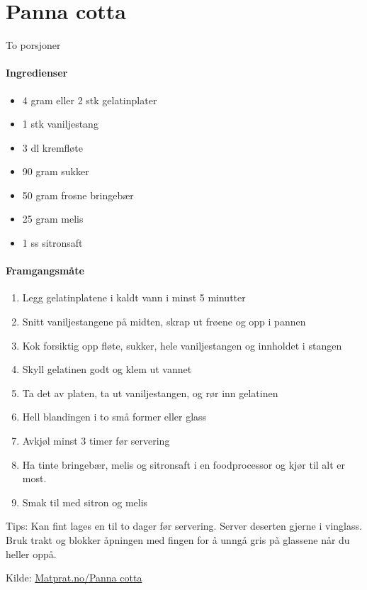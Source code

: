 \section{﻿Panna cotta}
\label{pannacotta}
To porsjoner

\paragraph{Ingredienser}
\begin{itemize}[noitemsep]
	\item 4 gram eller 2 stk gelatinplater
	\item 1 stk vaniljestang
	\item 3 dl kremfløte
	\item 90 gram sukker
	\item 50 gram frosne bringebær
	\item 25 gram melis
	\item 1 ss sitronsaft
\end{itemize}

\paragraph{Framgangsmåte}
\begin{enumerate}[noitemsep]
	\item Legg gelatinplatene i kaldt vann i minst 5 minutter
	\item Snitt vaniljestangene på midten, skrap ut frøene og opp i pannen
	\item Kok forsiktig opp fløte, sukker, hele vaniljestangen og innholdet i stangen
	\item Skyll gelatinen godt og klem ut vannet
	\item Ta det av platen, ta ut vaniljestangen, og rør inn gelatinen
	\item Hell blandingen i to små former eller glass
	\item Avkjøl minst 3 timer før servering
	\item Ha tinte bringebær, melis og sitronsaft i en foodprocessor og kjør til alt er most.
	\item Smak til med sitron og melis
\end{enumerate}

Tips: Kan fint lages en til to dager før servering. Server deserten gjerne i vinglass. Bruk trakt og blokker åpningen med fingen for å unngå gris på glassene når du heller oppå.

Kilde: \href{http://www.matprat.no/gjester/gjesteoppskrifter/panna-cotta/}{Matprat.no/Panna cotta}
